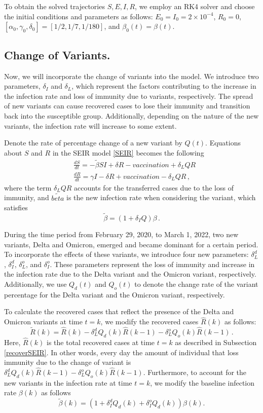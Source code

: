 \documentclass[sn-mathphys,Numbered]{sn-jnl}
\begin{document}
To obtain the solved trajectories $S, E, I, R$, we employ an RK4 solver and choose the initial conditions and parameters as follows: $E_0 = I_0 = 2\times 10^{-4}$, $R_0 = 0$, $[\alpha_0, \gamma_0, \delta_0] = [1/2, 1/7, 1/180]$, and $\beta_0(t) = \hat{\beta}(t)$.


\subsection{Change of Variants.}
Now, we will incorporate the change of variants into the model. We introduce two parameters, $\delta_I$ and $\delta_L$, which represent the factors contributing to the increase in the infection rate and loss of immunity due to variants, respectively. The spread of new variants can cause recovered cases to lose their immunity and transition back into the susceptible group. Additionally, depending on the nature of the new variants, the infection rate will increase to some extent. 

Denote the rate of percentage change of a new variant by $Q(t)$. Equations about $S$ and $R$ in the SEIR model \eqref{SEIR} becomes the following
\begin{align}
    & \frac{dS}{dt} = -\tilde{\beta} SI+\delta R - vaccination+\delta_LQR \nonumber\\
    & \frac{dR}{dt} = \gamma I - \delta R +vaccination-\delta_LQR \,,\label{VariantSEIR}
\end{align}
where the term $\delta_L Q R$ accounts for the transferred cases due to the loss of immunity, and $\tilde{beta}$ is the new infection rate when considering the variant, which satisfies 
$$
\tilde{\beta}=(1+\delta_I Q)\beta\,.
$$


During the time period from February 29, 2020, to March 1, 2022, two new variants, Delta and Omicron, emerged and became dominant for a certain period. To incorporate the effects of these variants, we introduce four new parameters: $\delta_L^d$, $\delta_I^d$, $\delta_L^o$, and $\delta_I^o$. These parameters represent the loss of immunity and increase in the infection rate due to the Delta variant and the Omicron variant, respectively. Additionally, we use $Q_d(t)$ and $Q_o(t)$ to denote the change rate of the variant percentage for the Delta variant and the Omicron variant, respectively.

To calculate the recovered cases that reflect the presence of the Delta and Omicron variants at time $t=k$, we modify the recovered cases $\hat{R}(k)$ as follows:
$$
\tilde{R}(k)=\hat{R}(k)-\delta_L^dQ_d(k)\hat{R}(k-1)-\delta_L^oQ_o(k)\hat{R}(k-1)\,.
$$
Here, $\hat{R}(k)$ is the total recovered cases at time $t=k$ as described in Subsection \ref{recoverSEIR}. In other words, every day the amount of individual that loss immunity due to the change of variant is $\delta_L^dQ_d(k)\hat{R}(k-1)-\delta_L^oQ_o(k)\hat{R}(k-1)$. Furthermore, to account for the new variants in the infection rate at time $t=k$, we modify the baseline infection rate $\beta(k)$ as follows
$$
\tilde{\beta}(k)=\left(1+\delta_I^dQ_d(k)+\delta_I^oQ_d(k)\right)\beta(k).
$$
\end{document}
